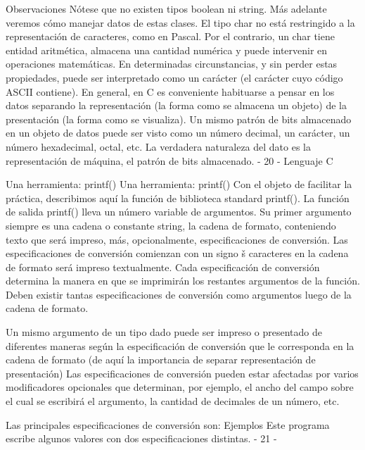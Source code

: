 Observaciones
Nótese que no existen tipos boolean ni string. Más adelante veremos cómo manejar datos de
estas clases.
El tipo char no está restringido a la representación de caracteres, como en Pascal. Por el contrario,
un char tiene entidad aritmética, almacena una cantidad numérica y puede intervenir en
operaciones matemáticas. En determinadas circunstancias, y sin perder estas propiedades, puede
ser interpretado como un carácter (el carácter cuyo código ASCII contiene).
En general, en C es conveniente habituarse a pensar en los datos separando la representación (la
forma como se almacena un objeto) de la presentación (la forma como se visualiza). Un mismo
patrón de bits almacenado en un objeto de datos puede ser visto como un número decimal, un
carácter, un número hexadecimal, octal, etc. La verdadera naturaleza del dato es la representación
de máquina, el patrón de bits almacenado.
- 20 -
Lenguaje C

Una herramienta: printf()
Una herramienta: printf()
Con el objeto de facilitar la práctica, describimos aquí la función de biblioteca standard printf().
La función de salida printf() lleva un número variable de argumentos.
Su primer argumento siempre es una cadena o constante string, la cadena de formato,
conteniendo texto que será impreso, más, opcionalmente, especificaciones de conversión.
Las especificaciones de conversión comienzan con un signo š%
caracteres en la cadena de formato será impreso textualmente.
Cada especificación de conversión determina la manera en que se imprimirán los restantes
argumentos de la función.
Deben existir tantas especificaciones de conversión como argumentos luego de la cadena de
formato.

Un mismo argumento de un tipo dado puede ser impreso o presentado de diferentes maneras
según la especificación de conversión que le corresponda en la cadena de formato (de aquí la
importancia de separar representación de presentación)
Las especificaciones de conversión pueden estar afectadas por varios modificadores opcionales
que determinan, por ejemplo, el ancho del campo sobre el cual se escribirá el argumento, la
cantidad de decimales de un número, etc.

Las principales especificaciones de conversión son:
Ejemplos
Este programa escribe algunos valores con dos especificaciones distintas.
- 21 -


